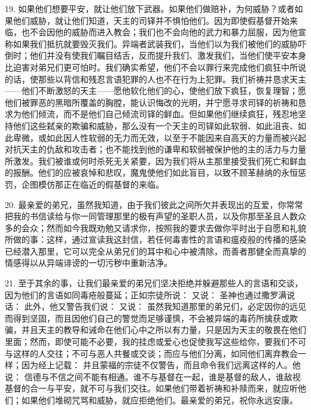 19. 如果他们想要平安，就让他们放下武器。如果他们做赔补，为何威胁？或者如果他们威胁，就让他们知道，天主的司铎并不惧怕他们。因为即使假基督开始来临，也不会因他的威胁而进入教会；我们也不会向他的武力和暴力屈服，因为他宣称如果我们抵抗就要毁灭我们。异端者武装我们，当他们以为我们被他们的威胁吓倒时；他们并没有使我们瞩目结舌，反而提升我们、激发我们，当他们使平安本身比迫害对弟兄们更可怕时。我们确实希望，他们不会以罪行来完成他们疯狂中所说的话，使那些以背信和残忍言语犯罪的人也不在行为上犯罪。我们祈祷并恳求天主——他们不断激怒的天主——愿他软化他们的心，使他们放下疯狂，恢复理智；愿他们被罪恶的黑暗所覆盖的胸膛，能认识悔改的光明，并宁愿寻求司铎的祈祷和恳求为他们倾流，而不是他们自己倾流司铎的鲜血。但如果他们继续疯狂，残忍地坚持他们这些弑亲的欺骗和威胁，那么没有一个天主的司铎如此软弱、如此沮丧、如此卑微，或如此因人性软弱的无力而无效，以至于不能因来自高天的力量而被兴起对抗天主的仇敌和攻击者；也不能找到他的谦卑和软弱被保护他的主的活力与力量所激发。我们被谁或何时杀死无关紧要，因为我们将从主那里接受我们死亡和鲜血的报酬。他们的应被哀悼和悲叹，魔鬼使他们如此盲目，以致不顾革赫纳的永恒惩罚，企图模仿那正在临近的假基督的来临。\par

20. 最亲爱的弟兄，虽然我知道，由于我们彼此之间所欠并表现出的互爱，你常常把我的书信读给与你一同管理那里的极有声望的圣职人员，以及你那至圣且人数众多的会众；然而如今我既劝勉又请求你，按照我的要求去做你平时出于自愿和礼貌所做的事：这样，通过宣读我这封信，若任何毒害性的言语和瘟疫般的传播的感染已经潜入那里，它可以完全从弟兄们的耳中和心中被清除，而善者那健全而真挚的情感得以从异端诽谤的一切污秽中重新洁净。\par

21. 至于其余的事，让我们最亲爱的弟兄们坚决拒绝并躲避那些人的言语和交谈，因为他们的言语如同毒疮般蔓延；正如宗徒所说： 又说： 圣神也通过撒罗满说话： 此外，他又警告我们说： 又说： 虽然我知道那里的弟兄们，必定因你的远见而得到坚固，而且因他们自己的警觉而足够谨慎，不会被异端的毒药所擒获或欺骗，并且天主的教导和诫命在他们心中之所以有力量，只是因为天主的敬畏在他们里面；然而，即使可能不必要，我的挂虑或爱心也促使我写这些给你，要我们不可与这样的人交往；不可与恶人共餐或交谈；而应与他们分离，如同他们离弃教会一样；因为经上记载： 并且蒙福的宗徒不仅警告，而且命令我们远离这样的人。他说： 信德与不信之间不能有相通。谁不与基督在一起，谁是基督的敌人，谁敌视基督的合一与平安，就不可与我们交往。如果他们带着祈祷和补赎而来，就应听他们；如果他们堆砌咒骂和威胁，就应拒绝他们。最亲爱的弟兄，祝你永远安康。\par


